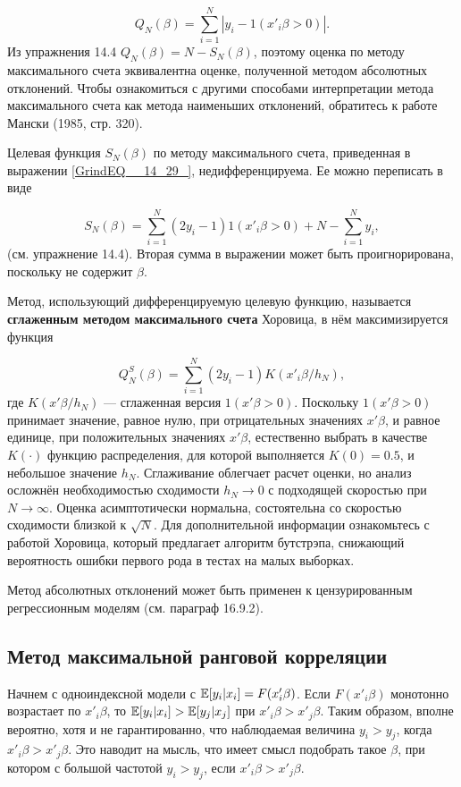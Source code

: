 \begin{equation} 
\label{GrindEQ__14_30_} 
Q_N(\beta) = \sum^N_{i=1} |y_i-1(x'_i\beta > 0)|. 
\end{equation} 
Из упражнения 14.4 $Q_N(\beta) = N - S_N(\beta)$, поэтому оценка по методу максимального счета эквивалентна оценке,  полученной методом абсолютных отклонений. Чтобы ознакомиться с другими способами интерпретации метода максимального счета как метода наименьших отклонений, обратитесь к работе Мански (1985,  стр. 320).

Целевая функция $S_N(\beta)$ по методу максимального счета, приведенная в выражении \eqref{GrindEQ__14_29_},  недифференцируема. Ее можно переписать в виде

\[
S_N(\beta) = \sum^N_{i=1} (2y_i-1) 1(x'_i\beta > 0) + N - \sum^N_{i=1} y_i,
\] 
(см. упражнение 14.4). Вторая сумма в выражении может быть проигнорирована, поскольку не содержит $\beta$.

Метод, использующий дифференцируемую целевую функцию, называется \textbf{сглаженным методом максимального счета} Хоровица, в нём максимизируется  функция

\[
Q^S_N(\beta) = \sum^N_{i=1} (2y_i-1) K (x'_i\beta/h_N),
\] 
где $K(x'\beta/h_N)$ --- сглаженная версия $1(x'\beta > 0).$ Поскольку $1(x'\beta > 0)$ принимает значение,  равное нулю,  при отрицательных значениях $x'\beta $,  и равное единице,  при положительных значениях $x'\beta $, естественно выбрать в качестве $K(\cdot)$ функцию распределения,  для которой выполняется $K(0)=0.5$,  и небольшое значение $h_N$. Сглаживание облегчает  расчет оценки,  но анализ осложнён необходимостью сходимости $h_N \to 0$ с подходящей скоростью при  $N \to \infty $. Оценка асимптотически нормальна, состоятельна со скоростью сходимости близкой к $\sqrt{N}$. Для дополнительной информации ознакомьтесь с работой Хоровица,  который предлагает алгоритм бутстрэпа,  снижающий вероятность ошибки первого рода в тестах на малых выборках.

Метод абсолютных отклонений может быть применен к цензурированным регрессионным моделям (см. параграф 16.9.2). 

\subsection{Метод максимальной ранговой корреляции}

Начнем с одноиндексной модели с $\mathbb{E}[y_i| x_i] = F(x'_i\beta)$. Если $F(x'_i\beta)$ монотонно возрастает по $x'_i\beta$,  то $\mathbb{E}[y_i| x_i] > \mathbb{E}[y_j| x_j]$ при $x'_i\beta > x'_j\beta $. 
Таким образом,  вполне вероятно,  хотя и не гарантированно,  что наблюдаемая величина $y_i>y_j$,  когда $x'_i\beta > x'_j\beta $. Это наводит на мысль, что имеет смысл подобрать такое $\beta$,  при котором с большой частотой $y_i > y_j$, если $x'_i\beta > x'_j\beta $.

